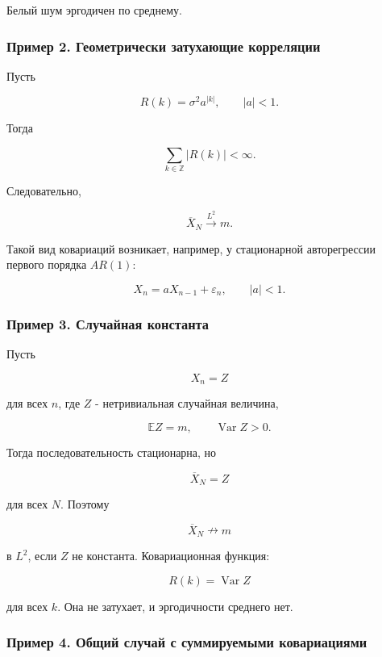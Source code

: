 \documentclass[
  11pt,
  a4paper,
]{article}
\begin{document}
Белый шум эргодичен по среднему.

\subsubsection{Пример 2. Геометрически затухающие
корреляции}\label{ux43fux440ux438ux43cux435ux440-2.-ux433ux435ux43eux43cux435ux442ux440ux438ux447ux435ux441ux43aux438-ux437ux430ux442ux443ux445ux430ux44eux449ux438ux435-ux43aux43eux440ux440ux435ux43bux44fux446ux438ux438}

Пусть

\[
R(k)=\sigma^2 a^{|k|},
\qquad
|a|<1.
\]

Тогда

\[
\sum_{k\in\mathbb Z}|R(k)|<\infty.
\]

Следовательно,

\[
\overline X_N\xrightarrow{L^2}m.
\]

Такой вид ковариаций возникает, например, у стационарной авторегрессии
первого порядка \(AR(1)\):

\[
X_n=aX_{n-1}+\varepsilon_n,
\qquad
|a|<1.
\]

\subsubsection{Пример 3. Случайная
константа}\label{ux43fux440ux438ux43cux435ux440-3.-ux441ux43bux443ux447ux430ux439ux43dux430ux44f-ux43aux43eux43dux441ux442ux430ux43dux442ux430}

Пусть

\[
X_n=Z
\]

для всех \(n\), где \(Z\) - нетривиальная случайная величина,

\[
\mathbb EZ=m,
\qquad
\operatorname{Var}Z>0.
\]

Тогда последовательность стационарна, но

\[
\overline X_N=Z
\]

для всех \(N\). Поэтому

\[
\overline X_N\nrightarrow m
\]

в \(L^2\), если \(Z\) не константа. Ковариационная функция:

\[
R(k)=\operatorname{Var}Z
\]

для всех \(k\). Она не затухает, и эргодичности среднего нет.

\subsubsection{Пример 4. Общий случай с суммируемыми
ковариациями}\label{ux43fux440ux438ux43cux435ux440-4.-ux43eux431ux449ux438ux439-ux441ux43bux443ux447ux430ux439-ux441-ux441ux443ux43cux43cux438ux440ux443ux435ux43cux44bux43cux438-ux43aux43eux432ux430ux440ux438ux430ux446ux438ux44fux43cux438}
\end{document}
